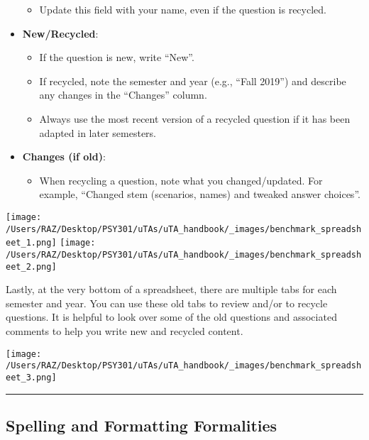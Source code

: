 \documentclass[
]{article}
\providecommand{\tightlist}{%
  \setlength{\itemsep}{0pt}\setlength{\parskip}{0pt}}
\begin{document}
\begin{itemize}
  \begin{itemize}
  \tightlist
  \item
    Update this field with your name, even if the question is recycled.
  \end{itemize}
\item
  \textbf{New/Recycled}:

  \begin{itemize}
  \tightlist
  \item
    If the question is new, write ``New''.\\
  \item
    If recycled, note the semester and year (e.g., ``Fall 2019'') and describe any changes in the ``Changes'' column.
  \item
    Always use the most recent version of a recycled question if it has been adapted in later semesters.
  \end{itemize}
\item
  \textbf{Changes (if old)}:

  \begin{itemize}
  \tightlist
  \item
    When recycling a question, note what you changed/updated. For example, ``Changed stem (scenarios, names) and tweaked answer choices''.
  \end{itemize}
\end{itemize}

\texttt{[image: /Users/RAZ/Desktop/PSY301/uTAs/uTA\_handbook/\_images/benchmark\_spreadsheet\_1.png]}
\texttt{[image: /Users/RAZ/Desktop/PSY301/uTAs/uTA\_handbook/\_images/benchmark\_spreadsheet\_2.png]}

Lastly, at the very bottom of a spreadsheet, there are multiple tabs for each semester and year. You can use these old tabs to review and/or to recycle questions. It is helpful to look over some of the old questions and associated comments to help you write new and recycled content.

\texttt{[image: /Users/RAZ/Desktop/PSY301/uTAs/uTA\_handbook/\_images/benchmark\_spreadsheet\_3.png]}

\begin{center}\rule{0.5\linewidth}{0.5pt}\end{center}

\hypertarget{spelling-and-formatting-formalities}{%
\subsection{Spelling and Formatting Formalities}\label{spelling-and-formatting-formalities}}
\end{document}
